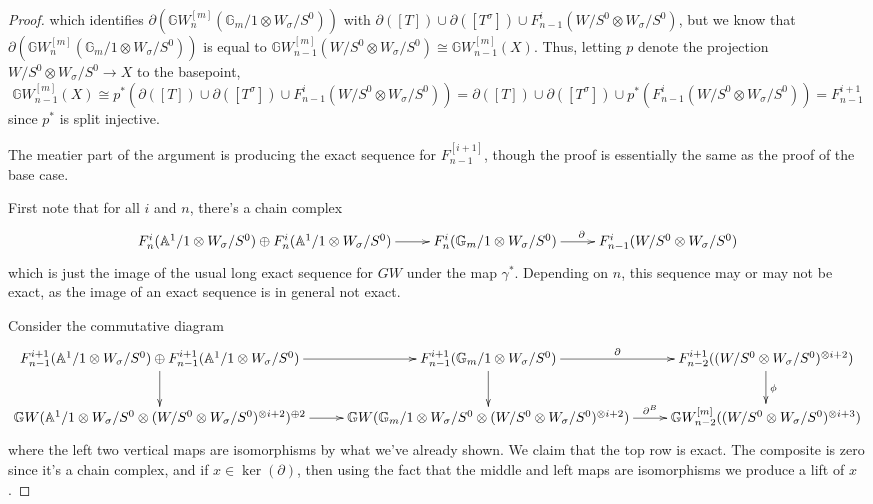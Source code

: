 \documentclass[edeposit,fullpage]{uiucthesis2009}
\newcommand{\mbb}{\mathbb}
\theoremstyle{plain}
\numberwithin{lemma}{section}
\theoremstyle{definition}
\begin{document}
\begin{proof}
which identifies $\partial(\mbb GW^{[m]}_n(\mbb G_m/1
  \otimes W_\sigma/S^0))$ with $\partial([T]) \cup \partial([T^\sigma])
\cup  F^{i}_{n-1}(W/S^0 \otimes W_\sigma/S^0)$, but we know that
  $\partial(\mbb GW^{[m]}_n(\mbb G_m/1
  \otimes W_\sigma/S^0))$ is equal to $\mbb
GW^{[m]}_{n-1}(W/S^0 \otimes W_\sigma/S^0) \cong \mbb
GW^{[m]}_{n-1}(X)$. Thus, letting $p$ denote the projection $W/S^0
\otimes W_\sigma/S^0 \rightarrow X$ to the basepoint, 
\[
\mbb GW^{[m]}_{n-1}(X) \cong p^*(\partial([T]) \cup \partial([T^\sigma])
\cup  F^{i}_{n-1}(W/S^0 \otimes W_\sigma/S^0)) = \partial([T]) \cup \partial([T^\sigma])
\cup  p^*(F^{i}_{n-1}(W/S^0 \otimes W_\sigma/S^0))  = F^{i+1}_{n-1}
\]
since $p^*$ is split injective.

The meatier part of the argument is producing the exact sequence for
$F^{[i+1]}_{n-1}$, though the proof is essentially the same as the
proof of the base case. 

First note that for all $i$ and $n$, there's a chain complex
\[
\xymatrix{F^i_n(\mbb A^1/1 \otimes W_\sigma/S^0)  \oplus F^i_n(\mbb
  A^1/1 \otimes W_\sigma/S^0)  \ar[r] & F^i_n(\mbb G_m/1 \otimes W_\sigma/S^0) \ar[r]^{\partial} &
  F^{i}_{n-1}(W/S^0 \otimes W_\sigma/S^0) }
\]
which is just the image of the usual long exact sequence for $GW$
under the map $\gamma^*$. Depending on $n$, this sequence
may or may not be exact, as the image of an exact sequence is in
general not exact. 

Consider the commutative diagram
\small
\[
\xymatrix{F^{i+1}_{n-1}(\mbb A^1/1 \otimes W_\sigma/S^0)  \oplus F^{i+1}_{n-1}(\mbb
  A^1/1 \otimes W_\sigma/S^0)  \ar[r] \ar[d]& F^{i+1}_{n-1}(\mbb G_m/1
  \otimes W_\sigma/S^0) \ar[r]^-{\partial} \ar[d]& \ar[d]^{\phi}
  F^{i+1}_{n-2}((W/S^0 \otimes W_\sigma/S^0)^{\otimes i+2}) \\
\mbb GW(\mbb A^1/1 \otimes W_\sigma/S^0 \otimes (W/S^0 \otimes
W_\sigma/S^0)^{\otimes i+2})^{\oplus 2} \ar[r] & \mbb
GW(\mbb G_m/1 \otimes W_\sigma/S^0 \otimes (W/S^0 \otimes W_\sigma/S^0)^{\otimes i+2}) \ar[r]^-{\partial^B} &
 \mbb GW^{[m]}_{n-2}((W/S^0 \otimes W_\sigma/S^0)^{\otimes i+3}) }
\]
\normalsize
where the left two vertical maps are isomorphisms by what we've
already shown. We claim that the top row is exact. The composite is
zero since it's a chain complex, and if $x \in \ker(\partial)$, then
using the fact that the middle and left maps are isomorphisms we
produce a lift of $x$. 



\end{proof}
\end{document}
